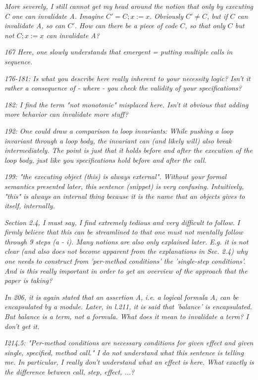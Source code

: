 \documentclass[11pt]{amsart}
\newcommand{\rev}[1]{\emph #1}
\begin{document}
{\rev {{ More severely, I still cannot get my head around the notion that only by executing C one can invalidate A. Imagine $C' = C; x:=x$. Obviously $C' \neq C$, but if $C$ can invalidate A, so can $C'$. How can there be a piece of code $C$, so that only $C$ but not $C; x:=x$ can invalidate A? }}}

{\rev {{167 Here, one slowly understands that emergent = putting multiple calls in sequence. }}}

{\rev {{176-181: Is what you describe here really inherent to your necessity logic? Isn't it rather a consequence of - where - you check the validity of your specifications? }}}

{\rev {{182: I find the term "not monotonic" misplaced here. Isn't it obvious that adding more behavior can invalidate more stuff? }}}

{\rev {{192: One could draw a comparison to loop invariants: While pushing a loop invariant through a loop body, the invariant can (and likely will) also break intermediately. The point is just that it holds before and after the execution of the loop body, just like you specifications hold before and after the call. }}}

{\rev {{199: "the executing object (this) is always external". Without your formal semantics presented later, this sentence (snippet) is very confusing. Intuitively, "this" is always an internal thing because it is the name that an objects gives to itself, internally. }}}

{\rev {{ Section 2.4, I must say, I find extremely tedious and very difficult to follow. I firmly believe that this can be streamlined to that one must not mentally follow through 9 steps (a - i). Many notions are also only explained later. E.g. it is not clear (and also does not become apparent from the explanations in Sec. 2.4) why one needs to construct from 'per-method conditions' the 'single-step conditions'. And is this really important in order to get an overview of the approach that the paper is taking? }}}

 {\rev {{  In 206, it is again stated that an assertion A, i.e. a logical formula A, can be encapsulated by a module. Later, in l.211, it is said that 'balance' is encapsulated. But balance is a term, not a formula. What does it mean to invalidate a term? I don't get it. }}}

{\rev {{I214.5: "Per-method conditions are necessary conditions for given effect and given single, specified, method call." I do not understand what this sentence is telling me. In particular, I really don't understand what an effect is here. What exactly is the difference between call, step, effect, ...? }}}
\end{document}
